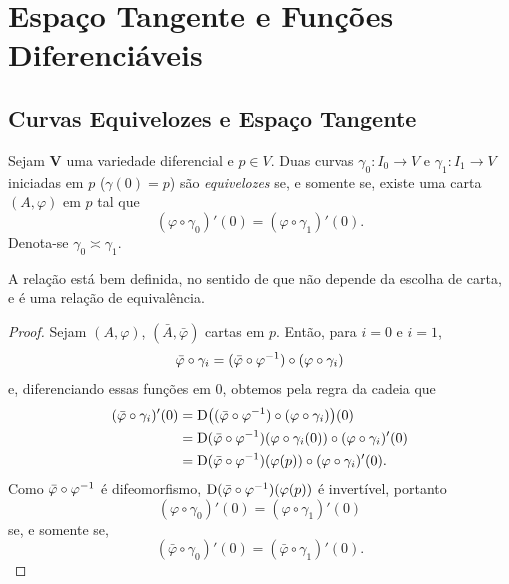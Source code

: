 \section{Espaço Tangente e Funções Diferenciáveis}

\subsection{Curvas Equivelozes e Espaço Tangente}

\begin{defi}
Sejam $\bm V$ uma variedade diferencial e $p \in V$. Duas curvas $\gamma_0: I_0 \to V$ e $\gamma_1: I_1 \to V$ iniciadas em $p$ ($\gamma(0)=p$) são \emph{equivelozes} se, e somente se, existe uma carta $(A,\varphi)$ em $p$ tal que
	\begin{equation*}
	(\varphi \circ \gamma_0)'(0) = (\varphi \circ \gamma_1)'(0).
	\end{equation*}
Denota-se $\gamma_0 \asymp \gamma_1$.
\end{defi}

A relação está bem definida, no sentido de que não depende da escolha de carta, e é uma relação de equivalência.

\begin{proof}
Sejam $(A,\varphi)$, $(\bar A,\bar \varphi)$ cartas em $p$. Então, para $i=0$ e $i=1$,
	\begin{equation*}
	\bar\varphi \circ \gamma_i = (\bar\varphi \circ \varphi^{-1}) \circ (\varphi \circ \gamma_i)
	\end{equation*}
e, diferenciando essas funções em $0$, obtemos pela regra da cadeia que
	\begin{align*}
	(\bar\varphi \circ \gamma_i)'(0) &= \mathrm{D} \big( (\bar\varphi \circ \varphi^{-1}) \circ (\varphi \circ \gamma_i) \big)(0) \\
	&= \mathrm{D}(\bar\varphi \circ \varphi^{-1})(\varphi \circ \gamma_i(0)) \circ (\varphi \circ \gamma_i)'(0) \\
	&=  \mathrm{D}(\bar\varphi \circ \varphi^{-1})(\varphi(p)) \circ (\varphi \circ \gamma_i)'(0).
	\end{align*}
Como $\bar\varphi \circ \varphi^{-1}$ é difeomorfismo, $\mathrm{D}(\bar\varphi \circ \varphi^{-1})(\varphi(p))$ é invertível, portanto
	\begin{equation*}
	(\varphi \circ \gamma_0)'(0) = (\varphi \circ \gamma_1)'(0)
	\end{equation*}
se, e somente se,
	\begin{equation*}
	(\bar\varphi \circ \gamma_0)'(0) = (\bar\varphi \circ \gamma_1)'(0).
	\end{equation*}
\end{proof}

